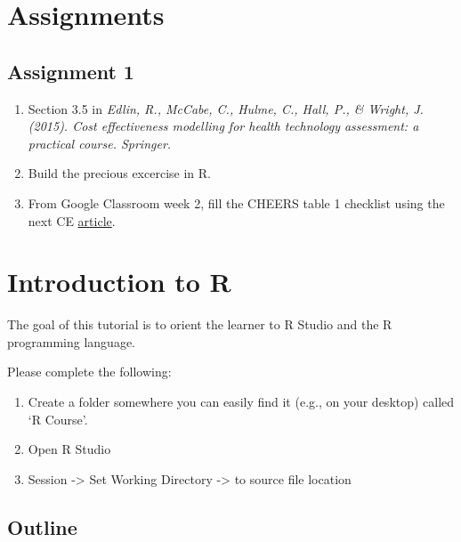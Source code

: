 \documentclass[
]{book}
\providecommand{\tightlist}{%
  \setlength{\itemsep}{0pt}\setlength{\parskip}{0pt}}
\begin{document}
\hypertarget{assignments}{%
\chapter*{Assignments}\label{assignments}}

\hypertarget{assignment-1}{%
\section*{Assignment 1}\label{assignment-1}}

\begin{enumerate}
\def\labelenumi{\arabic{enumi}.}
\tightlist
\item
  Section 3.5 in \emph{Edlin, R., McCabe, C., Hulme, C., Hall, P., \& Wright, J. (2015). Cost effectiveness modelling for health technology assessment: a practical course. Springer.}
\item
  Build the precious excercise in R.
\item
  From Google Classroom week 2, fill the CHEERS table 1 checklist using the next CE \href{https://jamanetwork.com/journals/jamanetworkopen/fullarticle/2775235}{article}.
\end{enumerate}

\hypertarget{introduction-to-r}{%
\chapter*{Introduction to R}\label{introduction-to-r}}

The goal of this tutorial is to orient the learner to R Studio and the R programming language.

Please complete the following:

\begin{enumerate}
\def\labelenumi{\arabic{enumi}.}
\tightlist
\item
  Create a folder somewhere you can easily find it (e.g., on your desktop) called `R Course'.
\item
  Open R Studio
\item
  Session -\textgreater{} Set Working Directory -\textgreater{} to source file location
\end{enumerate}

\hypertarget{outline}{%
\section*{Outline}\label{outline}}
\end{document}
